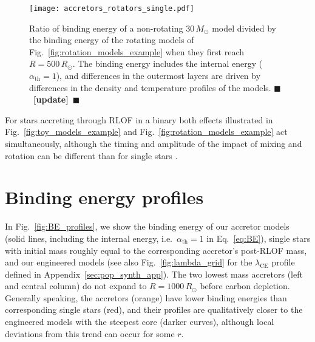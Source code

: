 \documentclass[twocolumn,twocolappendix,trackchanges]{aastex63}
\DeclareRobustCommand{\Eqref}[1]{Eq.~\ref{#1}}
\DeclareRobustCommand{\Figref}[1]{Fig.~\ref{#1}}
\newcommand{\todo}[1]{{\large $\blacksquare$~\textbf{\color{red}[#1]}}~$\blacksquare$}
\begin{document}
\begin{figure}[htbp]
  \texttt{[image: accretors\_rotators\_single.pdf]}
  \caption{Ratio of binding energy of a
      non-rotating $30\,M_\odot$ model divided by the binding energy
      of the rotating models of \Figref{fig:rotation_models_example}
      when they first reach $R=500\,R_\odot$. The binding energy
      includes the internal energy ($\alpha_\mathrm{th}=1$), and
      differences in the outermost layers are driven by differences in
      the density and temperature profiles of the models. \todo{update}}
  \label{fig:accretors_rotators_single}
\end{figure}

For stars accreting through RLOF in a binary both
effects illustrated in \Figref{fig:toy_models_example} and
\Figref{fig:rotation_models_example} act simultaneously, although the
timing and amplitude of the impact of mixing and rotation can be
different than for single stars \citep[e.g.,][]{renzo:2021zoph}.


\section{Binding energy profiles}
\label{sec:BE}

In \Figref{fig:BE_profiles}, we show the binding energy of our
accretor models (solid lines,
including the internal energy, i.e.\ $\alpha_\mathrm{th}=1$ in
\Eqref{eq:BE}),
single stars with initial mass roughly equal
to the corresponding accretor's post-RLOF mass, and our engineered models (see also
\Figref{fig:lambda_grid} for the $\lambda_\mathrm{CE}$ profile defined in Appendix~\ref{sec:pop_synth_app}). The two
lowest mass accretors (left and central column) do not expand to
$R=1000\, R_\odot$ before carbon depletion. Generally speaking, the
accretors (orange) have lower binding energies than corresponding
single stars (red), and their profiles are qualitatively closer to the
engineered models with the steepest core (darker curves), although
local deviations from this trend can occur for some $r$.
\end{document}
